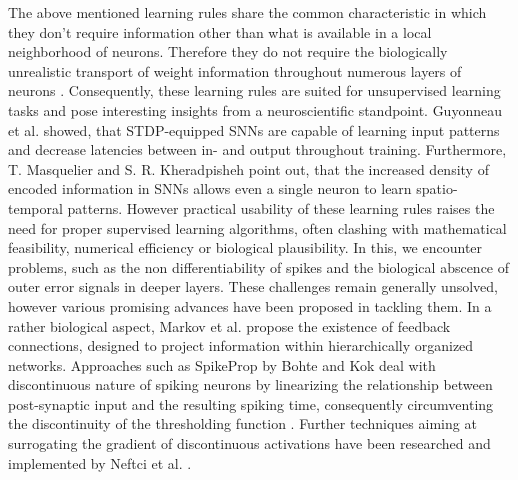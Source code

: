 \documentclass[letterpaper, 10 pt, conference]{ieeeconf}  %
\begin{document}
The above mentioned learning rules share the common characteristic in which they don't require information other than what is available 
in a local neighborhood of neurons. Therefore they do not require the biologically unrealistic 
transport of weight information throughout numerous layers of neurons \cite{samadiDeepLearningDynamic2017} \cite{chintaAdaptiveOptimalControl2012}
\cite{crickRecentExcitementNeural1989}\cite{decoNeurodynamicalCorticalModel2004}. Consequently, these learning rules 
are suited for unsupervised learning tasks and pose interesting 
insights from a neuroscientific standpoint. Guyonneau et al. \cite{masquelierSpikeTimingDependent2008} \cite{tavanaeiDeepLearningSpiking2019}
showed, that STDP-equipped SNNs are capable of learning input 
patterns and decrease latencies between in- and output throughout training. Furthermore, T. Masquelier \cite{masquelierSpikeTimingDependent2008}
and S. R. Kheradpisheh \cite{tavanaeiDeepLearningSpiking2019} point out, that 
the increased density of encoded information in SNNs allows even a single neuron to learn spatio-temporal patterns. However practical usability
of these learning rules raises the need for proper supervised learning algorithms, often clashing with mathematical feasibility, numerical efficiency 
or biological plausibility. In this, we encounter problems, such as the non differentiability of spikes and the biological abscence of outer error 
signals in deeper layers. These challenges remain generally unsolved, however various promising advances have been proposed in tackling them.
In a rather biological aspect, Markov et al.\cite{markovAnatomyHierarchyFeedforward2014} propose the existence of
feedback connections, designed to project information within
hierarchically organized networks. Approaches such as SpikeProp by Bohte and Kok deal with discontinuous nature of spiking neurons by linearizing 
the relationship between post-synaptic input and the resulting spiking time, consequently circumventing the discontinuity of the 
thresholding function \cite{bohteSpikePropBackpropagationNetworks}. Further techniques aiming at surrogating the gradient of 
discontinuous activations have been researched 
and implemented by Neftci et al. \cite{neftciSurrogateGradientLearning2019}.
\end{document}
